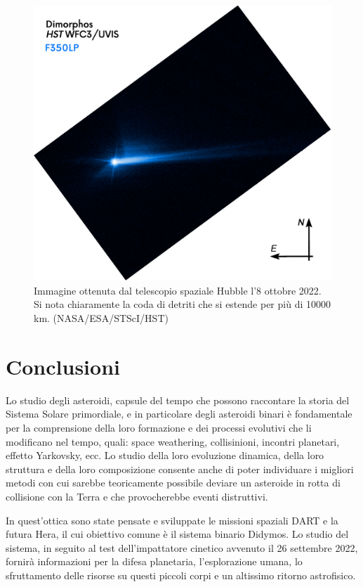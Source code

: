 \begin{figure}
    \centering
    \includegraphics[scale=0.25]{figure/hst_plume.png}
    \caption[Immagine della coda di detriti ottenuta da HST.]{Immagine ottenuta dal telescopio spaziale Hubble l'8 ottobre 2022. Si nota chiaramente la coda di detriti che si estende per più di 10000 km. (NASA/ESA/STScI/HST)}
    \label{fig:hst_plume}
\end{figure}

\chapter*{Conclusioni}

Lo studio degli asteroidi, capsule del tempo che possono raccontare la storia del Sistema Solare primordiale, e in particolare degli asteroidi binari è fondamentale per la comprensione della loro formazione e dei processi evolutivi che li modificano nel tempo, quali: space weathering, collisinioni, incontri planetari, effetto Yarkovsky, ecc. Lo studio della loro evoluzione dinamica, della loro struttura e della loro composizione consente anche di poter individuare i migliori metodi con cui sarebbe teoricamente possibile deviare un asteroide in rotta di collisione con la Terra e che provocherebbe eventi distruttivi. 

In quest'ottica sono state pensate e sviluppate le missioni spaziali DART e la futura Hera, il cui obiettivo comune è il sistema binario Didymos. Lo studio del sistema, in seguito al test dell'impattatore cinetico avvenuto il 26 settembre 2022, fornirà informazioni per la difesa planetaria, l'esplorazione umana, lo sfruttamento delle risorse su questi piccoli corpi e un altissimo ritorno astrofisico.

